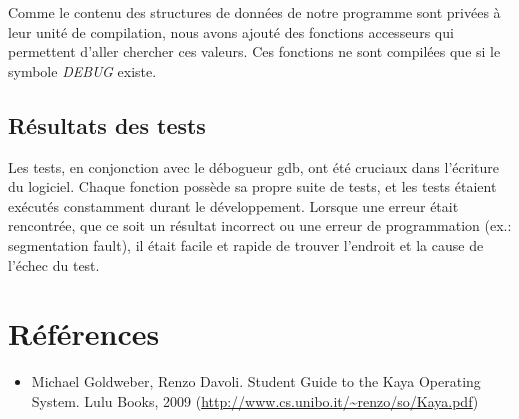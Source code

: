 \documentclass[10pt]{article}
\begin{document}
Comme le contenu des structures de données de notre programme sont
privées à leur unité de compilation, nous avons ajouté des fonctions
accesseurs qui permettent d'aller chercher ces valeurs.  Ces fonctions
ne sont compilées que si le symbole \emph{DEBUG} existe.

\subsection{Résultats des tests}

Les tests, en conjonction avec le débogueur gdb, ont été cruciaux dans
l'écriture du logiciel.  Chaque fonction possède sa propre suite de
tests, et les tests étaient exécutés constamment durant le
développement.  Lorsque une erreur était rencontrée, que ce soit un
résultat incorrect ou une erreur de programmation (ex.: segmentation
fault), il était facile et rapide de trouver l'endroit et la cause de
l'échec du test.

\section{Références}


\begin{itemize}
\item Michael Goldweber, Renzo Davoli. Student Guide to the Kaya
  Operating System. Lulu Books, 2009
  (\url{http://www.cs.unibo.it/~renzo/so/Kaya.pdf})
\end{itemize}
\end{document}

